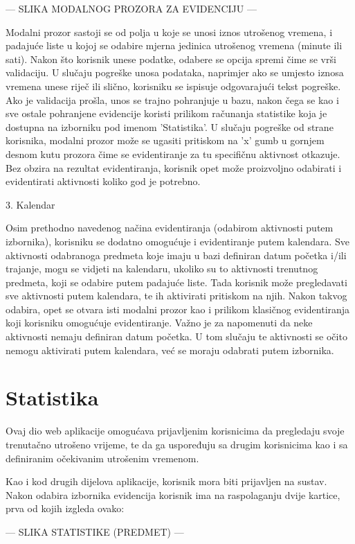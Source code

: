 \documentclass[times, utf8, zavrsni]{fer}
\begin{document}
--- SLIKA MODALNOG PROZORA ZA EVIDENCIJU ---

Modalni prozor sastoji se od polja u koje se unosi iznos utrošenog vremena, i padajuće liste u kojoj se odabire mjerna jedinica utrošenog vremena (minute ili sati). Nakon što korisnik unese podatke, odabere se opcija spremi čime se vrši validaciju. U slučaju pogreške unosa podataka, naprimjer ako se umjesto iznosa vremena unese riječ ili slično, korisniku se ispisuje odgovarajući tekst pogreške. Ako je validacija prošla, unos se trajno pohranjuje u bazu, nakon čega se kao i sve ostale pohranjene evidencije koristi prilikom računanja statistike koja je dostupna na izborniku pod imenom 'Statistika'.
U slučaju pogreške od strane korisnika, modalni prozor može se ugasiti pritiskom na 'x' gumb u gornjem desnom kutu prozora čime se evidentiranje za tu specifičnu aktivnost otkazuje.
Bez obzira na rezultat evidentiranja, korisnik opet može proizvoljno odabirati i evidentirati aktivnosti koliko god je potrebno.

3. Kalendar

Osim prethodno navedenog načina evidentiranja (odabirom aktivnosti putem izbornika), korisniku se dodatno omogućuje i evidentiranje putem kalendara. Sve aktivnosti odabranoga predmeta koje imaju u bazi definiran datum početka i/ili trajanje, mogu se vidjeti na kalendaru, ukoliko su to aktivnosti trenutnog predmeta, koji se odabire putem padajuće liste. Tada korisnik može pregledavati sve aktivnosti putem kalendara, te ih aktivirati pritiskom na njih. Nakon takvog odabira, opet se otvara isti modalni prozor kao i prilikom klasičnog evidentiranja koji korisniku omogućuje evidentiranje. Važno je za napomenuti da neke aktivnosti nemaju definiran datum početka. U tom slučaju te aktivnosti se očito nemogu aktivirati putem kalendara, već se moraju odabrati putem izbornika.

\section{Statistika}
Ovaj dio web aplikacije omogućava prijavljenim korisnicima da pregledaju svoje trenutačno utrošeno vrijeme, te da ga uspoređuju sa drugim korisnicima kao i sa definiranim očekivanim utrošenim vremenom.

Kao i kod drugih dijelova aplikacije, korisnik mora biti prijavljen na sustav. Nakon odabira izbornika evidencija korisnik ima na raspolaganju dvije kartice, prva od kojih izgleda ovako:

--- SLIKA STATISTIKE (PREDMET) ---
\end{document}
